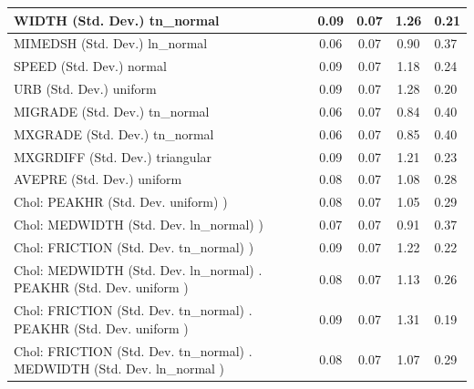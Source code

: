 \begin{table}
\begin{center}
\begin{tabular}{|l|l|c|c|c|l|}
			\hline
			WIDTH (Std. Dev.) tn_normal &  & 0.09 & 0.07 & 1.26 & 0.21 \\
			\hline
			MIMEDSH (Std. Dev.) ln_normal &  & 0.06 & 0.07 & 0.90 & 0.37 \\
			\hline
			SPEED (Std. Dev.) normal &  & 0.09 & 0.07 & 1.18 & 0.24 \\
			\hline
			URB (Std. Dev.) uniform &  & 0.09 & 0.07 & 1.28 & 0.20 \\
			\hline
			MIGRADE (Std. Dev.) tn_normal &  & 0.06 & 0.07 & 0.84 & 0.40 \\
			\hline
			MXGRADE (Std. Dev.) tn_normal &  & 0.06 & 0.07 & 0.85 & 0.40 \\
			\hline
			MXGRDIFF (Std. Dev.) triangular &  & 0.09 & 0.07 & 1.21 & 0.23 \\
			\hline
			AVEPRE (Std. Dev.) uniform &  & 0.08 & 0.07 & 1.08 & 0.28 \\
			\hline
			 Chol: PEAKHR (Std. Dev. uniform) ) &  & 0.08 & 0.07 & 1.05 & 0.29 \\
			\hline
			 Chol: MEDWIDTH (Std. Dev. ln_normal) ) &  & 0.07 & 0.07 & 0.91 & 0.37 \\
			\hline
			 Chol: FRICTION (Std. Dev. tn_normal) ) &  & 0.09 & 0.07 & 1.22 & 0.22 \\
			\hline
			 Chol: MEDWIDTH (Std. Dev. ln_normal) . PEAKHR (Std. Dev.   uniform ) &  & 0.08 & 0.07 & 1.13 & 0.26 \\
			\hline
			 Chol: FRICTION (Std. Dev. tn_normal) . PEAKHR (Std. Dev.   uniform ) &  & 0.09 & 0.07 & 1.31 & 0.19 \\
			\hline
			 Chol: FRICTION (Std. Dev. tn_normal) . MEDWIDTH (Std. Dev.   ln_normal ) &  & 0.08 & 0.07 & 1.07 & 0.29 \\
			\hline
		\end{tabular}
	\end{center}
\end{table}